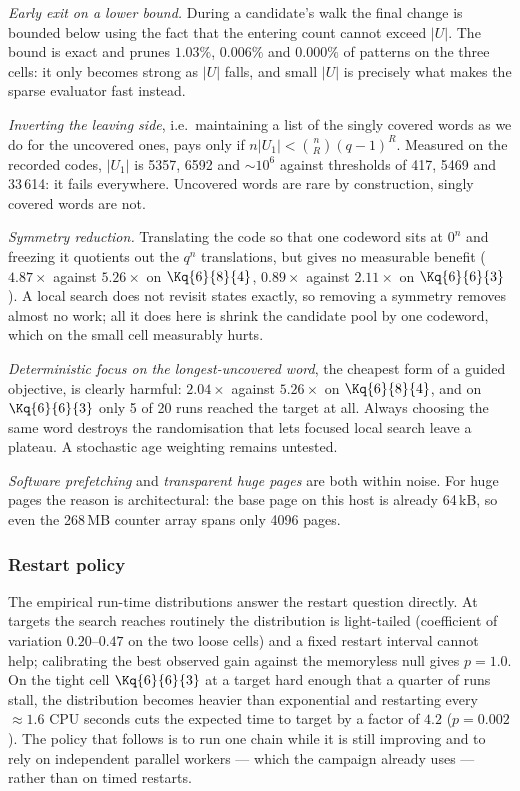 \emph{Early exit on a lower bound.} During a candidate's walk the final
change is bounded below using the fact that the entering count cannot exceed
$|U|$. The bound is exact and prunes $1.03\%$, $0.006\%$ and $0.000\%$ of
patterns on the three cells: it only becomes strong as $|U|$ falls, and small
$|U|$ is precisely what makes the sparse evaluator fast instead.

\emph{Inverting the leaving side}, i.e.\ maintaining a list of the singly
covered words as we do for the uncovered ones, pays only if
$n|U_1| < \binom{n}{R}(q-1)^R$. Measured on the recorded codes, $|U_1|$ is
5357, 6592 and ${\sim}10^6$ against thresholds of 417, 5469 and 33\,614: it
fails everywhere. Uncovered words are rare by construction, singly covered
words are not.

\emph{Symmetry reduction.} Translating the code so that one codeword sits at
$0^n$ and freezing it quotients out the $q^n$ translations, but gives no
measurable benefit ($4.87\times$ against $5.26\times$ on $\Kq{6}{8}{4}$,
$0.89\times$ against $2.11\times$ on $\Kq{6}{6}{3}$). A local search does not
revisit states exactly, so removing a symmetry removes almost no work; all it
does here is shrink the candidate pool by one codeword, which on the small
cell measurably hurts.

\emph{Deterministic focus on the longest-uncovered word}, the cheapest form
of a guided objective, is clearly harmful: $2.04\times$ against $5.26\times$
on $\Kq{6}{8}{4}$, and on $\Kq{6}{6}{3}$ only 5 of 20 runs reached the target
at all. Always choosing the same word destroys the randomisation that lets
focused local search leave a plateau. A stochastic age weighting remains
untested.

\emph{Software prefetching} and \emph{transparent huge pages} are both within
noise. For huge pages the reason is architectural: the base page on this host
is already 64\,kB, so even the 268\,MB counter array spans only 4096 pages.

\subsubsection*{Restart policy}

The empirical run-time distributions answer the restart question directly. At
targets the search reaches routinely the distribution is light-tailed
(coefficient of variation $0.20$--$0.47$ on the two loose cells) and a fixed
restart interval cannot help; calibrating the best observed gain against the
memoryless null gives $p=1.0$. On the tight cell $\Kq{6}{6}{3}$ at a target
hard enough that a quarter of runs stall, the distribution becomes heavier
than exponential and restarting every ${\approx}1.6$ CPU seconds cuts the
expected time to target by a factor of $4.2$ ($p=0.002$). The policy that
follows is to run one chain while it is still improving and to rely on
independent parallel workers --- which the campaign already uses --- rather
than on timed restarts.
